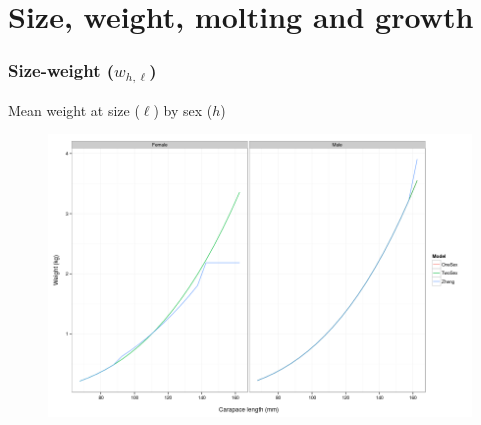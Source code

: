 \documentclass{beamer}
\begin{document}

\section{Size, weight, molting and growth}


\begin{frame}
\frametitle{Size-weight ($w_{h,\ell}$)}
Mean weight at size ($\ell$) by sex ($h$)
\begin{figure}[!htbp]
  \centering
  \includegraphics[width=0.75\linewidth]{figure/length_weight-1.png}
\end{figure}
\end{frame}



\end{document}
